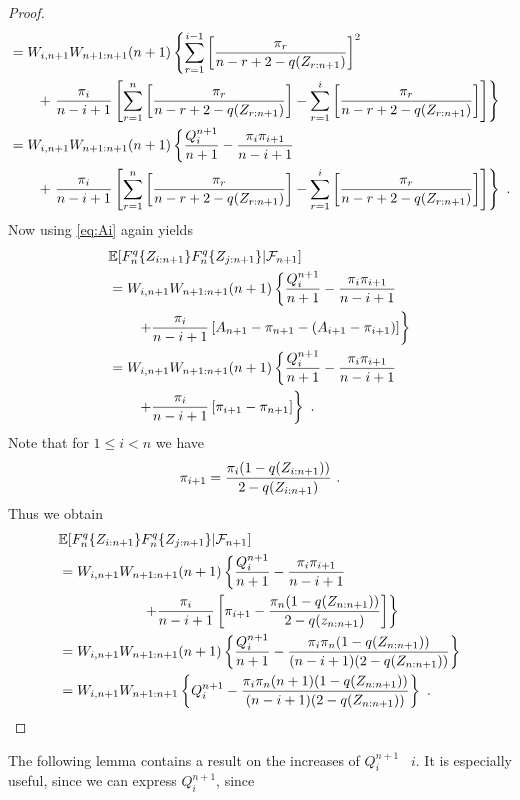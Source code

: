 \begin{proof}
\begin{align*}
	&= W_{i,n+1}W_{n+1:n+1}(n+1) \left\{\sum\limits_{r=1}^{i-1}\left[\frac{\pi_r}{n-r+2-q(Z_{r:n+1})} \right]^2\right.\\
	& \qquad + \left. \frac{\pi_i}{n-i+1}\left[\sum\limits_{r=1}^{n} \left[\frac{\pi_r}{n-r+2-q(Z_{r:n+1})}\right] - \sum\limits_{r=1}^{i} \left[\frac{\pi_r}{n-r+2-q(Z_{r:n+1})}\right]\right]\right\}\\
	&= W_{i,n+1}W_{n+1:n+1}(n+1) \left\{\frac{Q_i^{n+1}}{n+1} - \frac{\pi_i\pi_{i+1}}{n-i+1}\right.\\
	& \qquad + \left. \frac{\pi_i}{n-i+1}\left[\sum\limits_{r=1}^{n} \left[\frac{\pi_r}{n-r+2-q(Z_{r:n+1})}\right] - \sum\limits_{r=1}^{i}  \left[\frac{\pi_r}{n-r+2-q(Z_{r:n+1})}\right]\right]\right\}\textrm{ .}
\end{align*}
%
Now using \eqref{eq:Ai} again yields
\begin{align*}
	&  \mathbb{E}[F_n^q\{Z_{i:n+1}\}F_n^q\{Z_{j:n+1}\}|\mathcal{F}_{n+1}]\\
	&= W_{i,n+1}W_{n+1:n+1}(n+1) \left\{\frac{Q_i^{n+1}}{n+1} - \frac{\pi_i\pi_{i+1}}{n-i+1}\right.\\
	& \qquad \left. + \frac{\pi_i}{n-i+1}\left[A_{n+1} - \pi_{n+1} - (A_{i+1}-\pi_{i+1}) \right] \right\}\\
	&= W_{i,n+1}W_{n+1:n+1}(n+1) \left\{\frac{Q_i^{n+1}}{n+1} - \frac{\pi_i\pi_{i+1}}{n-i+1}\right.\\
	& \qquad \left. + \frac{\pi_i}{n-i+1}\left[  \pi_{i+1} - \pi_{n+1} \right] \right\}\textrm{ .}
\end{align*}
Note that for $1\leq i< n$ we have
$$\pi_{i+1} = \frac{\pi_i (1-q(Z_{i:n+1}))}{2-q(Z_{i:n+1})}\textrm{ .}$$
Thus we obtain
\begin{align*}
	&  \mathbb{E}[F_n^q\{Z_{i:n+1}\}F_n^q\{Z_{j:n+1}\}|\mathcal{F}_{n+1}]\\
	&= W_{i,n+1}W_{n+1:n+1}(n+1) \left\{\frac{Q_i^{n+1}}{n+1} - \frac{\pi_i\pi_{i+1}}{n-i+1}\right.\\
	& \qquad\qquad\qquad \left. + \frac{\pi_i}{n-i+1}\left[\pi_{i+1} - \frac{\pi_n(1-q(Z_{n:n+1}))}{2-q(z_{n:n+1})}   \right] \right\}\\
	&= W_{i,n+1}W_{n+1:n+1}(n+1) \left\{\frac{Q_i^{n+1}}{n+1} - \frac{\pi_i\pi_n(1-q(Z_{n:n+1}))}{(n-i+1)(2-q(Z_{n:n+1}))} \right\}\\
	&= W_{i,n+1}W_{n+1:n+1} \left\{Q_i^{n+1} - \frac{\pi_i\pi_n(n+1)(1-q(Z_{n:n+1}))}{(n-i+1)(2-q(Z_{n:n+1}))} \right\}\textrm{ .}
\end{align*}
\end{proof}
%
The following lemma contains a result on the increases of $Q_i^{n+1}$ \wrt\ $i$. It is especially useful, since we can express $Q_i^{n+1}$, since 
